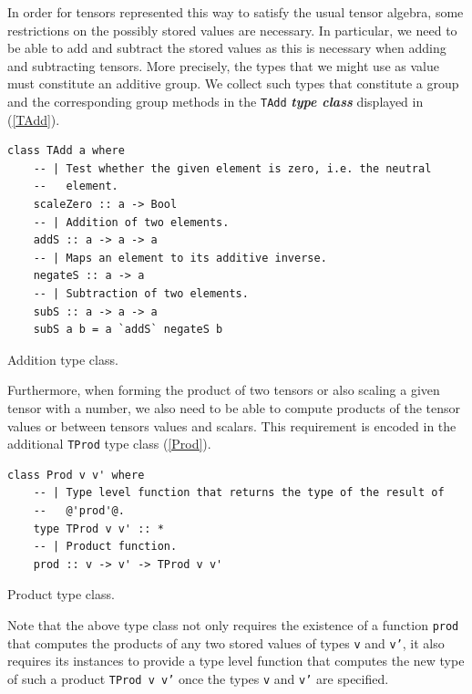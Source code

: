 \documentclass[a4paper,12pt, DIV=14, BCOR=5mm, twoside, headsepline, numbers=noenddot]{scrbook}
\begin{document}
In order for tensors represented this way to satisfy the usual tensor algebra, some restrictions on the possibly stored values are necessary. In particular, we need to be able to add and subtract the stored values as this is necessary when adding and subtracting tensors.
More precisely, the types that we might use as value must constitute an additive group. 
We collect such types that constitute a group and the corresponding group methods in the \texttt{TAdd} \textit{\textbf{type class}} displayed in (\ref{TAdd}).

\begin{listing}[hbt!]
\begin{verbatim}
class TAdd a where
    -- | Test whether the given element is zero, i.e. the neutral
    --   element.
    scaleZero :: a -> Bool
    -- | Addition of two elements.
    addS :: a -> a -> a
    -- | Maps an element to its additive inverse.
    negateS :: a -> a
    -- | Subtraction of two elements.
    subS :: a -> a -> a
    subS a b = a `addS` negateS b
\end{verbatim} 
\caption{Addition type class.}\label{TAdd}
\end{listing}

Furthermore, when forming the product of two tensors or also scaling a given tensor with a number, we also need to be able to compute products of the tensor values or between tensors values and scalars. This requirement is encoded in the additional \texttt{TProd} type class (\ref{Prod}).

\begin{listing}[hbt!] 
\begin{verbatim}
class Prod v v' where
    -- | Type level function that returns the type of the result of
    --   @'prod'@.
    type TProd v v' :: *
    -- | Product function.
    prod :: v -> v' -> TProd v v'
\end{verbatim} 
\caption{Product type class.}\label{Prod}
\end{listing}

Note that the above type class not only requires the existence of a function \texttt{prod} that computes the products of any two stored values of types \texttt{v} and \texttt{v'}, it also requires its instances to provide a type level function that computes the new type of such a product \texttt{TProd v v'} once the types \texttt{v} and \texttt{v'} are specified.
\end{document}
